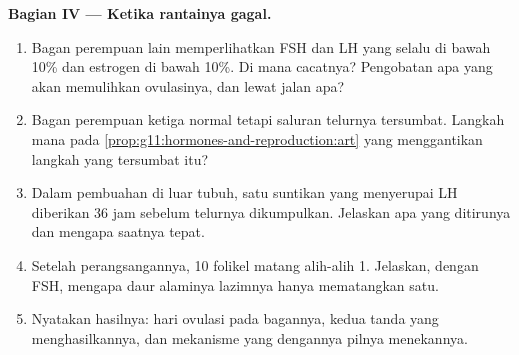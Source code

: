 \begin{problem}
\medskip
\noindent\textbf{Bagian IV --- Ketika rantainya gagal.}
\begin{enumerate}[resume]
  \item Bagan perempuan lain memperlihatkan FSH dan LH yang selalu di
        bawah 10\% dan estrogen di bawah 10\%. Di mana cacatnya?
        Pengobatan apa yang akan memulihkan ovulasinya, dan lewat jalan apa?
  \item Bagan perempuan ketiga normal tetapi saluran telurnya
        tersumbat. Langkah mana pada
        \cref{prop:g11:hormones-and-reproduction:art} yang menggantikan
        langkah yang tersumbat itu?
  \item Dalam pembuahan di luar tubuh, satu suntikan  yang
        menyerupai LH diberikan 36 jam sebelum  telurnya
        dikumpulkan. Jelaskan apa yang ditirunya dan mengapa saatnya tepat.
  \item Setelah perangsangannya, 10 folikel matang alih-alih 1.
        Jelaskan, dengan FSH, mengapa daur alaminya lazimnya hanya
        mematangkan satu.
  \item Nyatakan hasilnya: hari ovulasi pada bagannya, kedua tanda
         yang menghasilkannya, dan mekanisme yang dengannya
        pilnya menekannya.
\end{enumerate}
\end{problem}
